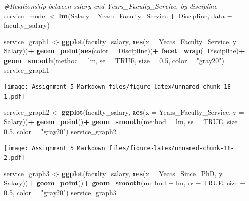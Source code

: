 \documentclass[]{article}
\newenvironment{Shaded}{\begin{snugshade}}{\end{snugshade}}
\newcommand{\KeywordTok}[1]{\textcolor[rgb]{0.13,0.29,0.53}{\textbf{#1}}}
\newcommand{\DataTypeTok}[1]{\textcolor[rgb]{0.13,0.29,0.53}{#1}}
\newcommand{\FloatTok}[1]{\textcolor[rgb]{0.00,0.00,0.81}{#1}}
\newcommand{\StringTok}[1]{\textcolor[rgb]{0.31,0.60,0.02}{#1}}
\newcommand{\CommentTok}[1]{\textcolor[rgb]{0.56,0.35,0.01}{\textit{#1}}}
\newcommand{\OtherTok}[1]{\textcolor[rgb]{0.56,0.35,0.01}{#1}}
\newcommand{\OperatorTok}[1]{\textcolor[rgb]{0.81,0.36,0.00}{\textbf{#1}}}
\newcommand{\NormalTok}[1]{#1}
\begin{document}
\begin{Shaded}
\begin{Highlighting}[]
\CommentTok{#Relationship between salary and Years_Faculty_Service, by discipline}
\NormalTok{service_model <-}\StringTok{ }\KeywordTok{lm}\NormalTok{(Salary }\OperatorTok{~}\StringTok{ }\NormalTok{Years_Faculty_Service }\OperatorTok{+}\StringTok{ }\NormalTok{Discipline, }\DataTypeTok{data =}\NormalTok{ faculty_salary)}

\NormalTok{service_graph1 <-}\StringTok{ }\KeywordTok{ggplot}\NormalTok{(faculty_salary, }\KeywordTok{aes}\NormalTok{(}\DataTypeTok{x =}\NormalTok{ Years_Faculty_Service, }\DataTypeTok{y =}\NormalTok{ Salary))}\OperatorTok{+}
\KeywordTok{geom_point}\NormalTok{(}\KeywordTok{aes}\NormalTok{(}\DataTypeTok{color =}\NormalTok{ Discipline))}\OperatorTok{+}
\StringTok{  }\KeywordTok{facet_wrap}\NormalTok{(}\OperatorTok{~}\NormalTok{Discipline)}\OperatorTok{+}
\StringTok{  }\KeywordTok{geom_smooth}\NormalTok{(}\DataTypeTok{method =}\NormalTok{ lm, }\DataTypeTok{se =} \OtherTok{TRUE}\NormalTok{, }\DataTypeTok{size =} \FloatTok{0.5}\NormalTok{, }\DataTypeTok{color =} \StringTok{"gray20"}\NormalTok{)}
\NormalTok{service_graph1}
\end{Highlighting}
\end{Shaded}

\texttt{[image: Assignment\_5\_Markdown\_files/figure-latex/unnamed-chunk-18-1.pdf]}

\begin{Shaded}
\begin{Highlighting}[]
\NormalTok{service_graph2 <-}\StringTok{ }\KeywordTok{ggplot}\NormalTok{(faculty_salary, }\KeywordTok{aes}\NormalTok{(}\DataTypeTok{x =}\NormalTok{ Years_Faculty_Service, }\DataTypeTok{y =}\NormalTok{ Salary))}\OperatorTok{+}
\KeywordTok{geom_point}\NormalTok{()}\OperatorTok{+}
\StringTok{  }\KeywordTok{geom_smooth}\NormalTok{(}\DataTypeTok{method =}\NormalTok{ lm, }\DataTypeTok{se =} \OtherTok{TRUE}\NormalTok{, }\DataTypeTok{size =} \FloatTok{0.5}\NormalTok{, }\DataTypeTok{color =} \StringTok{"gray20"}\NormalTok{)}
\NormalTok{service_graph2}
\end{Highlighting}
\end{Shaded}

\texttt{[image: Assignment\_5\_Markdown\_files/figure-latex/unnamed-chunk-18-2.pdf]}

\begin{Shaded}
\begin{Highlighting}[]
\NormalTok{service_graph3 <-}\StringTok{ }\KeywordTok{ggplot}\NormalTok{(faculty_salary, }\KeywordTok{aes}\NormalTok{(}\DataTypeTok{x =}\NormalTok{ Years_Since_PhD, }\DataTypeTok{y =}\NormalTok{ Salary))}\OperatorTok{+}
\KeywordTok{geom_point}\NormalTok{()}\OperatorTok{+}
\StringTok{  }\KeywordTok{geom_smooth}\NormalTok{(}\DataTypeTok{method =}\NormalTok{ lm, }\DataTypeTok{se =} \OtherTok{TRUE}\NormalTok{, }\DataTypeTok{size =} \FloatTok{0.5}\NormalTok{, }\DataTypeTok{color =} \StringTok{"gray20"}\NormalTok{)}
\NormalTok{service_graph3}
\end{Highlighting}
\end{Shaded}
\end{document}
